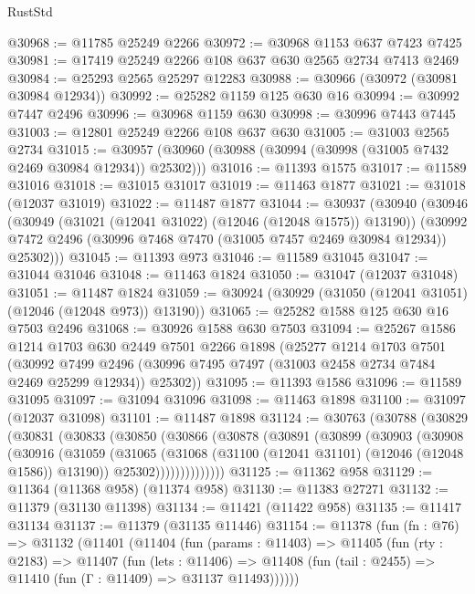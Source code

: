 \begin{lexlean}{RustStd}
\begin{coremodule}
@30968 := @11785 @25249 @2266
@30972 := @30968 @1153 @637 @7423 @7425
@30981 := @17419 @25249 @2266 @108 @637 @630 @2565 @2734 @7413 @2469
@30984 := @25293 @2565 @25297 @12283
@30988 := @30966 (@30972 (@30981 @30984 @12934))
@30992 := @25282 @1159 @125 @630 @16
@30994 := @30992 @7447 @2496
@30996 := @30968 @1159 @630
@30998 := @30996 @7443 @7445
@31003 := @12801 @25249 @2266 @108 @637 @630
@31005 := @31003 @2565 @2734
@31015 := @30957 (@30960 (@30988 (@30994 (@30998 (@31005 @7432 @2469 @30984 @12934)) @25302)))
@31016 := @11393 @1575
@31017 := @11589 @31016
@31018 := @31015 @31017
@31019 := @11463 @1877
@31021 := @31018 (@12037 @31019)
@31022 := @11487 @1877
@31044 := @30937
    (@30940
      (@30946
        (@30949 (@31021 (@12041 @31022) (@12046 (@12048 @1575)) @13190))
        (@30992 @7472 @2496 (@30996 @7468 @7470 (@31005 @7457 @2469 @30984 @12934)) @25302)))
@31045 := @11393 @973
@31046 := @11589 @31045
@31047 := @31044 @31046
@31048 := @11463 @1824
@31050 := @31047 (@12037 @31048)
@31051 := @11487 @1824
@31059 := @30924 (@30929 (@31050 (@12041 @31051) (@12046 (@12048 @973)) @13190))
@31065 := @25282 @1588 @125 @630 @16 @7503 @2496
@31068 := @30926 @1588 @630 @7503
@31094 := @25267
    @1586
    @1214
    @1703
    @630
    @2449
    @7501
    @2266
    @1898
    (@25277
      @1214
      @1703
      @7501
      (@30992
        @7499
        @2496
        (@30996 @7495 @7497 (@31003 @2458 @2734 @7484 @2469 @25299 @12934))
        @25302))
@31095 := @11393 @1586
@31096 := @11589 @31095
@31097 := @31094 @31096
@31098 := @11463 @1898
@31100 := @31097 (@12037 @31098)
@31101 := @11487 @1898
@31124 := @30763
    (@30788
      (@30829
        (@30831
          (@30833
            (@30850
              (@30866
                (@30878
                  (@30891
                    (@30899
                      (@30903
                        (@30908
                          (@30916
                            (@31059
                              (@31065
                                (@31068 (@31100 (@12041 @31101) (@12046 (@12048 @1586)) @13190))
                                @25302))))))))))))))
@31125 := @11362 @958
@31129 := @11364 (@11368 @958) (@11374 @958)
@31130 := @11383 @27271
@31132 := @11379 (@31130 @11398)
@31134 := @11421 (@11422 @958)
@31135 := @11417 @31134
@31137 := @11379 (@31135 @11446)
@31154 := @11378
    (fun (fn : @76) =>
    @31132
      (@11401
        (@11404
          (fun (params : @11403) =>
          @11405
            (fun (rty : @2183) =>
            @11407
              (fun (lets : @11406) =>
              @11408 (fun (tail : @2455) => @11410 (fun (Γ : @11409) => @31137 @11493))))))

\end{coremodule}
\end{lexlean}

